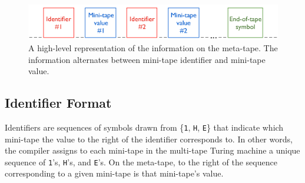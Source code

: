
\begin{figure} 
\begin{center} 
\includegraphics[scale=0.4]{figs/stmstmlayout.png} 
\caption{A high-level representation of the information on the meta-tape. The information alternates between mini-tape identifier and mini-tape value. \label{fig:stmstmlayout}}
\end{center} 
\end{figure}

\subsection{Identifier Format}

Identifiers are sequences of symbols drawn from \{\texttt{1}, \texttt{H}, \texttt{E}\} that indicate which mini-tape the value to the right of the identifier corresponds to. In other words, the compiler assigns to each mini-tape in the multi-tape Turing machine a unique sequence of \texttt{1}'s, \texttt{H}'s, and \texttt{E}'s. On the meta-tape, to the right of the sequence corresponding to a given mini-tape is that mini-tape's value. \\

